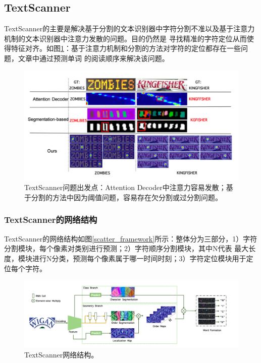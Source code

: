 \subsection{TextScanner}
TextScanner\cite{wan2019textscanner}的主要是解决基于分割的文本识别器中字符分割不准以及基于注意力机制的文本识别器中注意力发散的问题。目的仍然是
寻找精准的字符定位从而使得特征对齐。如图\ref{textscanner_introduction}：基于注意力机制和分割的方法对字符的定位都存在一些问题，文章中通过预测单词
的阅读顺序来解决该问题。

\begin{figure}[H]
    \centering
    \includegraphics[width=.8\textwidth]{figure/recognition/textscanner_introduction.png} 
    \caption{TextScanner问题出发点：Attention Decoder中注意力容易发散；基于分割的方法中因为阈值问题，容易存在欠分割或过分割问题。} 
    \label{textscanner_introduction} 
\end{figure}

\subsubsection{TextScanner的网络结构}
TextScanner的网络结构如图\ref{scatter_framework}所示：整体分为三部分，1）字符分割模块，每个像素对类别进行预测；2）字符顺序分割模块，其中N代表
最大长度，模块进行N分类，预测每个像素属于哪一时间时刻；3）字符定位模块用于定位每个字符。
\begin{figure}[H]
    \centering
    \includegraphics[width=.98\textwidth]{figure/recognition/textscanner_framework.png} 
    \caption{TextScanner网络结构。} 
    \label{textscanner_framework} 
\end{figure}

